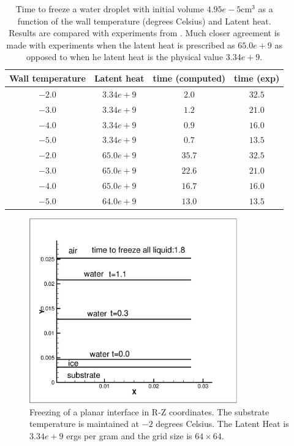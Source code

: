 \documentclass[]{article}
\begin{document}
\begin{table}[h!]
	\caption{Time to freeze a water droplet with 
	initial volume $4.95e-5\mbox{cm}^{3}$ as a 
	function of the wall temperature (degrees Celsius)
	and Latent heat.  Results are
	compared with experiments from \cite{hu2010icing}.  
	Much closer agreement is made with experiments when
	the latent heat is prescribed as $65.0e+9$ as opposed
	to when he latent heat is the physical value
	$3.34e+9$.
}
\centering
\begin{tabular}{|c|c|c|c|}
\hline
Wall temperature & Latent heat & time (computed) & time (exp) 
	 \\ \hline
$-2.0$ & $3.34e+9$ & $2.0$ & $32.5$ \\ \hline
$-3.0$ & $3.34e+9$ & $1.2$ & $21.0$ \\ \hline
$-4.0$ & $3.34e+9$ & $0.9$ & $16.0$ \\ \hline
$-5.0$ & $3.34e+9$ & $0.7$ & $13.5$ \\ \hline
$-2.0$ & $65.0e+9$ & $35.7$ & $32.5$ \\ \hline
$-3.0$ & $65.0e+9$ & $22.6$ & $21.0$ \\ \hline
$-4.0$ & $65.0e+9$ & $16.7$ & $16.0$ \\ \hline
$-5.0$ & $64.0e+9$ & $13.0$ & $13.5$ \\ \hline
\end{tabular}
\label{freezing_time}
\end{table}


\begin{figure}[htbp]
\centering
\includegraphics[width=0.8\textwidth]{freeze1d.eps} 
\caption{Freezing of a planar interface in R-Z coordinates.  
 The substrate temperature
 is maintained at $-2$ degrees Celsius. 
 The Latent Heat is $3.34e+9$ ergs per gram and
 the grid size is $64\times 64$. }
\label{rect_freeze}
\end{figure}
\end{document}
